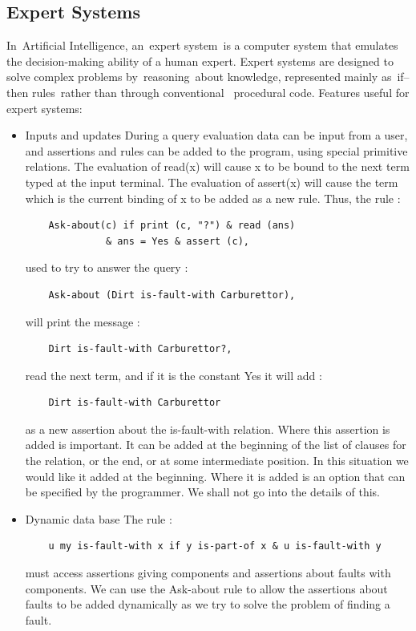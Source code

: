 \documentclass[14pt]{article}
\begin{document}
\subsection{Expert Systems}
In Artificial Intelligence, an expert system is a computer system that 
emulates the decision-making ability of a human expert. Expert systems 
are designed to solve complex problems by reasoning about knowledge, 
represented mainly as if–then rules rather than through conventional 
procedural code. 
Features useful for expert systems:
\begin{itemize}
\item Inputs and updates   
During a query evaluation data can be input from a user, and assertions 
and rules can be added to the program, using special primitive 
relations. The evaluation of read(x) will cause x to be bound to the 
next term typed at the input terminal. The evaluation of assert(x) will 
cause the term which is the current binding of x to be added as a new 
rule. Thus, the rule :
\begin{verbatim}
	Ask-about(c) if print (c, "?") & read (ans)
		      & ans = Yes & assert (c),
\end{verbatim}
used to try to answer the query :
\begin{verbatim}
	Ask-about (Dirt is-fault-with Carburettor),
\end{verbatim}
will print the message :
\begin{verbatim}
	Dirt is-fault-with Carburettor?, 
\end{verbatim}
read the next term, and if it is the constant Yes it will add :
\begin{verbatim}
	Dirt is-fault-with Carburettor
\end{verbatim}
as a new assertion about the is-fault-with relation. Where this 
assertion is added is important. It can be added at the beginning of 
the list of clauses for the relation, or the end, or at some 
intermediate position. In this situation we would like it added at the 
beginning. Where it is added is an option that can be specified by the 
programmer. We shall not go into the details of this. 
\item Dynamic data base 
The rule :
\begin{verbatim}
	u my is-fault-with x if y is-part-of x & u is-fault-with y 
\end{verbatim}
must access assertions giving components and assertions about faults 
with components. We can use the Ask-about rule to allow the assertions 
about faults to be added dynamically as we try to solve the problem of 
finding a fault. 


\end{itemize}
\end{document}
